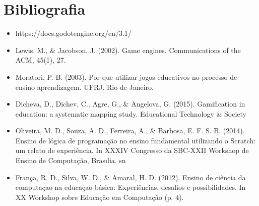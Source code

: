 
\chapter{Bibliografia}
\label{cap:Bibliografia}

\begin{itemize}
    \item[]
        https://docs.godotengine.org/en/3.1/
    \item[]
        Lewis, M., \& Jacobson, J. (2002). Game engines. Communications of the 
        ACM, 45(1), 27.
    \item[] 
        Moratori, P. B. (2003). Por que utilizar jogos educativos no processo de 
        ensino aprendizagem. UFRJ. Rio de Janeiro.
    \item[]
        Dicheva, D., Dichev, C., Agre, G., \& Angelova, G. (2015). Gamification in 
        education: a systematic mapping study. Educational Technology \& Society
    \item[]
        Oliveira, M. D., Souza, A. D., Ferreira, A., \& Barbosa, E. F. S. B. (2014). 
        Ensino de lógica de programação no ensino fundamental utilizando o Scratch: 
        um relato de experiência. In XXXIV Congresso da SBC-XXII Workshop de Ensino 
        de Computação, Brasılia. sn
    \item[]
        França, R. D., Silva, W. D., \& Amaral, H. D. (2012). Ensino de ciência da 
        computaçao na educaçao básica: Experiências, desafios e possibilidades. In 
        XX Workshop sobre Educação em Computação (p. 4).
\end{itemize}